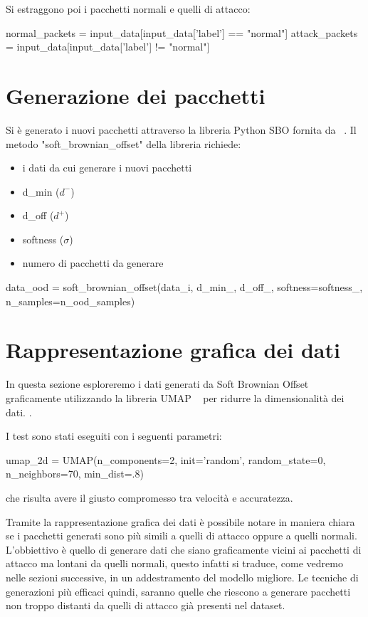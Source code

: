 Si estraggono poi i pacchetti normali e quelli di attacco:

\begin{python}
normal_packets = input_data[input_data['label'] == "normal"]
attack_packets = input_data[input_data['label'] != "normal"]
\end{python}


\section{Generazione dei pacchetti}

Si è generato i nuovi pacchetti attraverso la libreria Python SBO fornita da ~\cite{sbo}. Il metodo "soft\_brownian\_offset" della libreria richiede:

\begin{itemize}
    \item i dati da cui generare i nuovi pacchetti
    \item d\_min ($d^{-}$)
    \item d\_off ($d^{+}$)
    \item softness ($\sigma$)
    \item numero di pacchetti da generare
\end{itemize}

\begin{python}
data_ood = soft_brownian_offset(data_i, d_min_, d_off_,
                                    softness=softness_,
                                  n_samples=n_ood_samples)
\end{python}


\section{Rappresentazione grafica dei dati}
 
In questa sezione esploreremo i dati generati da Soft Brownian Offset graficamente utilizzando la libreria UMAP ~\cite{umap} per ridurre la dimensionalità dei dati. . 

I test sono stati eseguiti con i seguenti parametri:

\begin{python}
umap_2d = UMAP(n_components=2, init='random', random_state=0,
               n_neighbors=70, min_dist=.8)
\end{python}

che risulta avere il giusto compromesso tra velocità e accuratezza.

Tramite la rappresentazione grafica dei dati è possibile notare in maniera chiara se i pacchetti generati sono più simili a quelli di attacco oppure a quelli normali. L'obbiettivo è quello di generare dati che siano graficamente vicini ai pacchetti di attacco ma lontani da quelli normali, questo infatti si traduce, come vedremo nelle sezioni successive, in un addestramento del modello migliore. Le tecniche di generazioni più efficaci quindi, saranno quelle che riescono a generare pacchetti non troppo distanti da quelli di attacco già presenti nel dataset.

